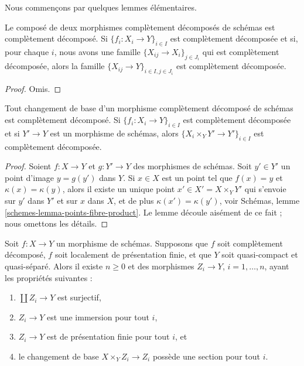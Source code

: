 \noindent
Nous commençons par quelques lemmes élémentaires.

\begin{lemma}
\label{lemma-composition-cd}
Le composé de deux morphismes complètement décomposés de schémas
est complètement décomposé.
Si $\{f_i : X_i \to Y\}_{i \in I}$ est complètement décomposée
et si, pour chaque $i$, nous avons une famille $\{X_{ij} \to X_i\}_{j \in J_i}$
qui est complètement décomposée, alors la famille
$\{X_{ij} \to Y\}_{i \in I, j \in J_i}$ est complètement décomposée.
\end{lemma}

\begin{proof}
Omis.
\end{proof}

\begin{lemma}
\label{lemma-base-change-cd}
Tout changement de base d'un morphisme complètement décomposé de schémas
est complètement décomposé.
Si $\{f_i : X_i \to Y\}_{i \in I}$ est complètement décomposée
et si $Y' \to Y$ est un morphisme de schémas, alors
$\{X_i \times_Y Y' \to Y'\}_{i \in I}$ est complètement
décomposée.
\end{lemma}

\begin{proof}
Soient $f : X \to Y$ et $g : Y' \to Y$ des morphismes de schémas.
Soit $y' \in Y'$ un point d'image $y = g(y')$ dans $Y$.
Si $x \in X$ est un point tel que $f(x) = y$ et $\kappa(x) = \kappa(y)$,
alors il existe un unique point $x' \in X' = X \times_Y Y'$
qui s'envoie sur $y'$ dans $Y'$ et sur $x$ dans $X$, et de plus
$\kappa(x') = \kappa(y')$, voir
Schémas, lemme \ref{schemes-lemma-points-fibre-product}.
Le lemme découle aisément de ce fait ; nous omettons les détails.
\end{proof}

\begin{lemma}
\label{lemma-decompose}
\begin{reference}
\cite[Lemme 2.1.2]{EHIK}
\end{reference}
Soit $f : X \to Y$ un morphisme de schémas. Supposons que
$f$ soit complètement décomposé,
$f$ soit localement de présentation finie, et que
$Y$ soit quasi-compact et quasi-séparé.
Alors il existe $n \geq 0$ et des morphismes
$Z_i \to Y$, $i = 1, \ldots, n$, ayant les propriétés suivantes :
\begin{enumerate}
\item $\coprod Z_i \to Y$ est surjectif,
\item $Z_i \to Y$ est une immersion pour tout $i$,
\item $Z_i \to Y$ est de présentation finie pour tout $i$, et
\item le changement de base $X \times_Y Z_i \to Z_i$ possède une section
pour tout $i$.
\end{enumerate}
\end{lemma}

